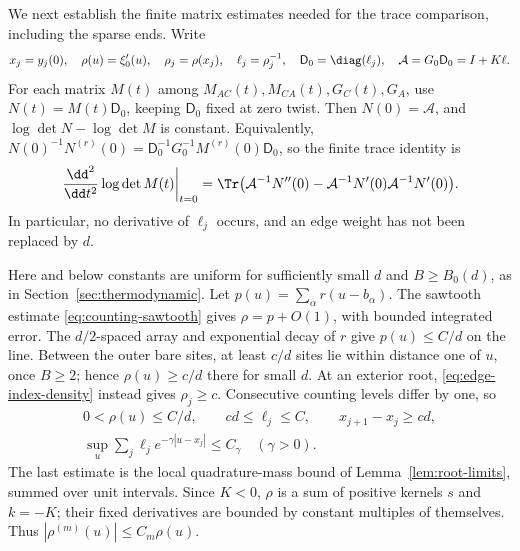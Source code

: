 We next establish the finite matrix estimates needed for the trace
comparison, including the sparse ends. Write
\[
 x_j=y_j(0),\quad \rho(u)=\xi_0'(u),\quad
 \rho_j=\rho(x_j),\quad \ell_j=\rho_j^{-1},\quad
 \mathsf D_0=\diag(\ell_j),\quad \mathcal A=G_0\mathsf D_0=I+K\ell.
\]
For each matrix \(M(t)\) among \(M_{AC}(t),M_{CA}(t),G_C(t),G_A\),
use \(N(t)=M(t)\mathsf D_0\), keeping \(\mathsf D_0\) fixed at zero twist.
Then \(N(0)=\mathcal A\), and \(\log\det N-\log\det M\) is constant.
Equivalently, \(N(0)^{-1}N^{(r)}(0)
=\mathsf D_0^{-1}G_0^{-1}M^{(r)}(0)\mathsf D_0\), so the finite trace identity is
\begin{equation}\label{eq:second-log-trace}
 \left.\frac{\dd^2}{\dd t^2}\log\det M(t)\right|_{t=0}
 =\Tr\bigl(\mathcal A^{-1}N''(0)
       -\mathcal A^{-1}N'(0)\mathcal A^{-1}N'(0)\bigr).
\end{equation}
In particular, no derivative of \(\ell_j\) occurs, and an edge weight
has not been replaced by \(d\).

Here and below constants are uniform for sufficiently small \(d\) and
\(B\ge B_0(d)\), as in Section~\ref{sec:thermodynamic}.
Let \(p(u)=\sum_\alpha r(u-b_\alpha)\).
The sawtooth estimate \eqref{eq:counting-sawtooth} gives
\(\rho=p+O(1)\), with bounded integrated error.
The \(d/2\)-spaced array and exponential decay of \(r\) give
\(p(u)\le C/d\) on the line. Between the outer bare sites,
at least \(c/d\) sites lie within distance one of \(u\), once \(B\ge2\);
hence \(\rho(u)\ge c/d\) there for small \(d\).
At an exterior root, \eqref{eq:edge-index-density} instead gives
\(\rho_j\ge c\). Consecutive counting levels differ by one, so
\begin{equation}\label{eq:overlap-finite-array-bounds}
 \begin{gathered}
 0<\rho(u)\le C/d,\qquad cd\le\ell_j\le C,
 \qquad x_{j+1}-x_j\ge cd,\\
 \sup_u\sum_j\ell_j e^{-\gamma|u-x_j|}\le C_\gamma
 \quad(\gamma>0).
 \end{gathered}
\end{equation}
The last estimate is the local quadrature-mass bound of
Lemma~\ref{lem:root-limits}, summed over unit intervals.
Since \(K<0\), \(\rho\) is a sum of positive kernels \(s\) and
\(k=-K\); their fixed derivatives are bounded by constant multiples
of themselves. Thus \(|\rho^{(m)}(u)|\le C_m\rho(u)\).

